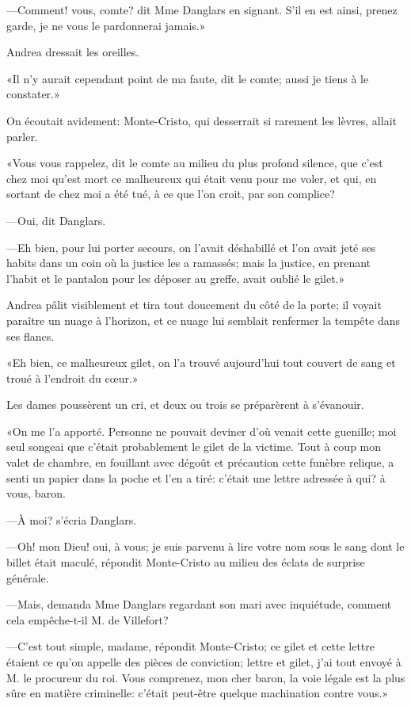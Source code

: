 —Comment! vous, comte? dit Mme Danglars en signant. S'il en est ainsi, prenez garde, je ne vous le pardonnerai jamais.» 

Andrea dressait les oreilles. 

«Il n'y aurait cependant point de ma faute, dit le comte; aussi je tiens à le constater.» 

On écoutait avidement: Monte-Cristo, qui desserrait si rarement les lèvres, allait parler. 

«Vous vous rappelez, dit le comte au milieu du plus profond silence, que c'est chez moi qu'est mort ce malheureux qui était venu pour me voler, et qui, en sortant de chez moi a été tué, à ce que l'on croit, par son complice? 

—Oui, dit Danglars. 

—Eh bien, pour lui porter secours, on l'avait déshabillé et l'on avait jeté ses habits dans un coin où la justice les a ramassés; mais la justice, en prenant l'habit et le pantalon pour les déposer au greffe, avait oublié le gilet.» 

Andrea pâlit visiblement et tira tout doucement du côté de la porte; il voyait paraître un nuage à l'horizon, et ce nuage lui semblait renfermer la tempête dans ses flancs. 

«Eh bien, ce malheureux gilet, on l'a trouvé aujourd'hui tout couvert de sang et troué à l'endroit du cœur.» 

Les dames poussèrent un cri, et deux ou trois se préparèrent à s'évanouir. 

«On me l'a apporté. Personne ne pouvait deviner d'où venait cette guenille; moi seul songeai que c'était probablement le gilet de la victime. Tout à coup mon valet de chambre, en fouillant avec dégoût et précaution cette funèbre relique, a senti un papier dans la poche et l'en a tiré: c'était une lettre adressée à qui? à vous, baron. 

—À moi? s'écria Danglars. 

—Oh! mon Dieu! oui, à vous; je suis parvenu à lire votre nom sous le sang dont le billet était maculé, répondit Monte-Cristo au milieu des éclats de surprise générale. 

—Mais, demanda Mme Danglars regardant son mari avec inquiétude, comment cela empêche-t-il M. de Villefort? 

—C'est tout simple, madame, répondit Monte-Cristo; ce gilet et cette lettre étaient ce qu'on appelle des pièces de conviction; lettre et gilet, j'ai tout envoyé à M. le procureur du roi. Vous comprenez, mon cher baron, la voie légale est la plus sûre en matière criminelle: c'était peut-être quelque machination contre vous.» 

